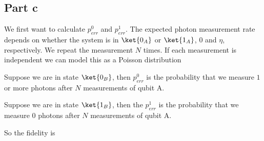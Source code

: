 \subsection*{Part c}
We first want to calculate $p_{err}^0$ and $p_{err}^1$. The expected photon measurement rate depends on whether the system is in $\ket{0_A}$ or $\ket{1_A}$, $0$ and $\eta$, respectively. We repeat the measurement $N$ times. If each measurement is independent we can model this as a Poisson distribution

Suppose we are in state $\ket{0_B}$, then $p_{err}^0$ is the probability that we measure $1$ or more photons after $N$ measurements of qubit A.


Suppose we are in state $\ket{1_B}$, then the $p_{err}^1$ is the probability that we measure $0$ photons after $N$ measurements of qubit A.


So the fidelity is
